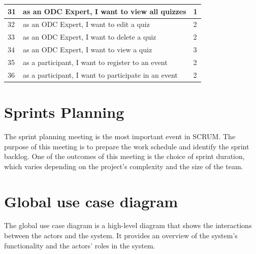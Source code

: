 \begin{longtable}{|l|p{10cm}|l|}
      31                                        & as an ODC Expert, I want to view all quizzes             & 1                 \\ \hline
      32                                        & as an ODC Expert, I want to edit a quiz                  & 2                 \\ \hline
      33                                        & as an ODC Expert, I want to delete a quiz                & 2                 \\ \hline
      34                                        & as an ODC Expert, I want to view a quiz                  & 3                 \\ \hline
      35                                        & as a participant, I want to register to an event         & 2                 \\ \hline
      36                                        & as a participant, I want to participate in an event      & 2                 \\ \hline
\end{longtable}


\section{Sprints Planning}
The sprint planning meeting is the most important event in SCRUM. The purpose
of this meeting is to prepare the work schedule and identify the sprint
backlog. One of the outcomes of this meeting is the choice of sprint duration,
which varies depending on the project's complexity and the size of the team.


\section{Global use case diagram}
The global use case diagram is a high-level diagram that shows the interactions
between the actors and the system. It provides an overview of the system's
functionality and the actors' roles in the system.

